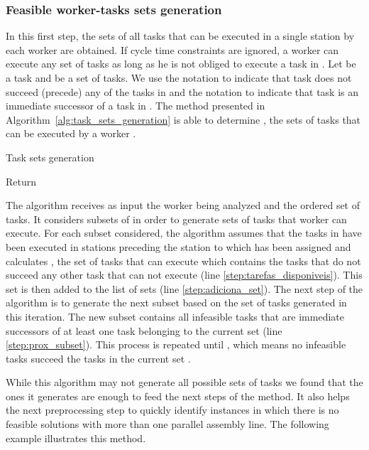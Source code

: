 \documentclass{singlecol-new}
\begin{document}
\subsubsection{Feasible worker-tasks sets generation}

In this first step, the sets of all tasks that can be executed in a single station by each worker are obtained. If cycle time constraints are ignored, a worker  can execute any set of tasks as long as he is not obliged to execute a task in . Let  be a task and  be a set of tasks.  We use the notation  to indicate that task  does not succeed (precede) any of the tasks in  and the notation  to indicate that task  is an immediate successor of a task in .  The method presented in Algorithm~\ref{alg:task_sets_generation} is able to determine , the sets of tasks that can be executed by a worker .

\begin{algorithm}[!ht]
\caption{Task sets generation}
\label{alg:task_sets_generation}
\begin{algorithmic}[1]
\REQUIRE  
\STATE 
\STATE 
\REPEAT
		\STATE \label{step:tarefas_disponiveis}
		\STATE \label{step:adiciona_set}
		\STATE \label{step:prox_subset}
\UNTIL{}
\STATE Return 
\end{algorithmic}
\end{algorithm}

The algorithm receives as input the worker being analyzed and the ordered set of tasks. It considers subsets of  in order to generate sets of tasks that worker  can execute. For each subset  considered, the algorithm assumes that the tasks in  have been executed in stations preceding the station to which  has been assigned and calculates , the set of tasks that  can execute which contains the tasks that do not succeed any other task that  can not execute (line \ref{step:tarefas_disponiveis}). This set is then added to the list of sets (line \ref{step:adiciona_set}). The next step of the algorithm is to generate the next subset  based on the set of tasks generated in this iteration. The new subset  contains all infeasible tasks that are immediate successors of at least one task belonging to the current set  (line \ref{step:prox_subset}). This process is repeated until , which means no infeasible tasks succeed the tasks in the current set .

While this algorithm may not generate all possible sets of tasks we found that the ones it generates are enough to feed the next steps of the method. It also helps the next preprocessing step to quickly identify instances in which there is no feasible solutions with more than one parallel assembly line. The following example illustrates this method.
\end{document}
